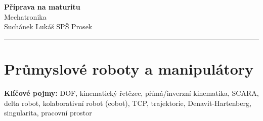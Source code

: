 \documentclass[a4paper,10pt]{article}
\begin{document}
\begin{minipage}[t]{0.75\textwidth}
    {\Huge\bfseries\color{accent} Příprava na maturitu}\\[4pt]
    {\large\color{stripeblue} Mechatronika}\\[2pt]
    \textcolor{medgray}{\small Suchánek Lukáš \quad SPŠ Prosek }
\end{minipage}
\hfill
\begin{minipage}[t]{0.22\textwidth}
    \raggedleft
\end{minipage}

\vspace{6pt}
\noindent\color{accent}\rule{\linewidth}{1.5pt}
\vspace{2pt}

\section{Průmyslové roboty a manipulátory}

\begin{pojmybox}
\textbf{Klíčové pojmy:}
DOF, kinematický řetězec, přímá/inverzní kinematika, SCARA,
delta robot, kolaborativní robot (cobot), TCP, trajektorie,
Denavit-Hartenberg, singularita, pracovní prostor
\end{pojmybox}
\end{document}
